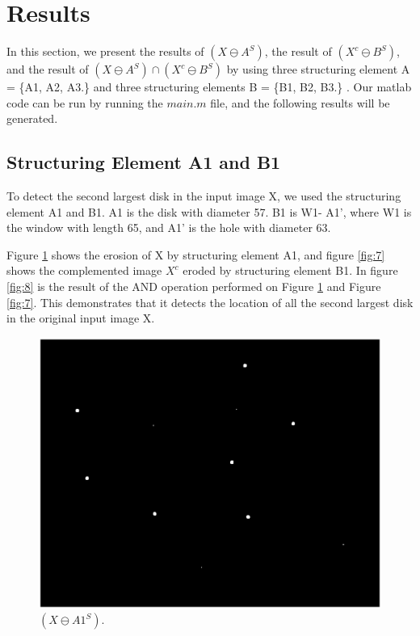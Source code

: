 \documentclass[paper=a4, fontsize=11pt]{scrartcl}
\begin{document}
\section{Results}

In this section, we present the results of $( X \ominus A^S)$, the result of $( X^c \ominus B^S)$, and the result of $( X \ominus A^S) \cap ( X^c \ominus B^S)$ by using three structuring element A = \{A1, A2, A3.\} and three structuring elements B = \{B1, B2, B3.\} .
Our matlab code can be run by running the $main.m$ file, and the following results will be generated.
\subsection{Structuring Element A1 and B1}

To detect the second largest disk in the input image X, we used the structuring element A1 and B1. A1 is the disk with diameter 57. B1 is W1- A1', where W1 is the window with length 65, and A1' is the hole with diameter 63.

Figure \ref{fig:6} shows the erosion of X by structuring element A1, and figure \ref{fig:7} shows the complemented image $X^c$ eroded by structuring element B1. In figure \ref{fig:8} is the result of the AND operation performed on Figure \ref{fig:6} and Figure \ref{fig:7}. This demonstrates that it detects the location of all the second largest disk in the original input image X.

\begin{figure}
	\centering
	\includegraphics[width=12cm]{SecondBiggestDisk_X_sub_As.eps}
	\caption{ $( X \ominus A1^S)$.}
	\label{fig:6}
\end{figure}
\end{document}
